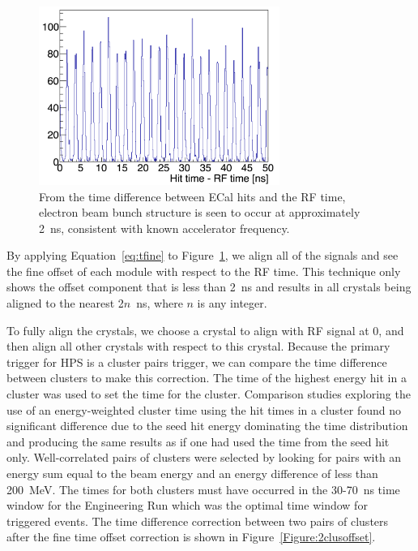 \begin{figure}[H]
  \centering
      \includegraphics[width=0.7\textwidth]{pics/performance/beamStructure.png}
  \caption[Time difference between ECal hits and RF time]{From the time difference between ECal hits and the RF time, electron beam bunch structure is seen to occur at approximately 2~ns, consistent with known accelerator frequency.}
  \label{Figure:beamBunch}
\end{figure}

By applying Equation~\eqref{eq:tfine} to Figure~\ref{Figure:beamBunch}, we align all of the signals and see the fine offset of each module with respect to the RF time. This technique only shows the offset component that is less than 2~ns and results in all crystals being aligned to the nearest 2$n$~ns, where $n$ is any integer. 


To fully align the crystals, we choose a crystal to align with RF signal at 0, and then align all other crystals with respect to this crystal. Because the primary trigger for HPS is a cluster pairs trigger, we can compare the time difference between clusters to make this correction. The time of the highest energy hit in a cluster was used to set the time for the cluster. Comparison studies exploring the use of an energy-weighted cluster time using the hit times in a cluster found no significant difference due to the seed hit energy dominating the time distribution and producing the same results as if one had used the time from the seed hit only. Well-correlated pairs of clusters were selected by looking for pairs with an energy sum equal to the beam energy and an energy difference of less than 200~MeV. The times for both clusters must have occurred in the 30-70~ns time window for the Engineering Run which was the optimal time window for triggered events. The time difference correction between two pairs of clusters after the fine time offset correction is shown in Figure~\ref{Figure:2clusoffset}.

